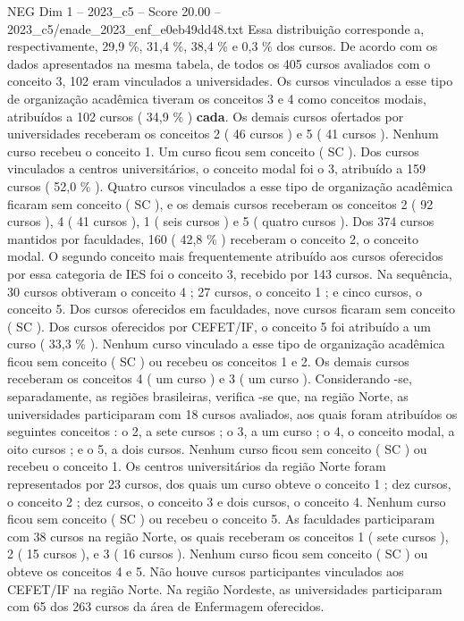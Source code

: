 \begin{textsample}{NEG Dim 1 – 2023\_c5 – Score 20.00 – 2023\_c5/enade\_2023\_enf\_e0eb49dd48.txt}
Essa distribuição corresponde a, respectivamente, 29,9 \%, 31,4 \%, 38,4 \% e 0,3 \% dos cursos.
De acordo com os dados apresentados na mesma tabela, de todos os 405 cursos avaliados com o conceito 3, 102 eram vinculados a universidades.
Os cursos vinculados a esse tipo de organização acadêmica tiveram os conceitos 3 e 4 como conceitos modais, atribuídos a 102 cursos ( 34,9 \% ) \textbf{cada}.
Os demais cursos ofertados por universidades receberam os conceitos 2 ( 46 cursos ) e 5 ( 41 cursos ).
Nenhum curso recebeu o conceito 1.
Um curso ficou sem conceito ( SC ).
Dos cursos vinculados a centros universitários, o conceito modal foi o 3, atribuído a 159 cursos ( 52,0 \% ).
Quatro cursos vinculados a esse tipo de organização acadêmica ficaram sem conceito ( SC ), e os demais cursos receberam os conceitos 2 ( 92 cursos ), 4 ( 41 cursos ), 1 ( seis cursos ) e 5 ( quatro cursos ).
Dos 374 cursos mantidos por faculdades, 160 ( 42,8 \% ) receberam o conceito 2, o conceito modal.
O segundo conceito mais frequentemente atribuído aos cursos oferecidos por essa categoria de IES foi o conceito 3, recebido por 143 cursos.
Na sequência, 30 cursos obtiveram o conceito 4 ; 27 cursos, o conceito 1 ; e cinco cursos, o conceito 5.
Dos cursos oferecidos em faculdades, nove cursos ficaram sem conceito ( SC ).
Dos cursos oferecidos por CEFET/IF, o conceito 5 foi atribuído a um curso ( 33,3 \% ).
Nenhum curso vinculado a esse tipo de organização acadêmica ficou sem conceito ( SC ) ou recebeu os conceitos 1 e 2.
Os demais cursos receberam os conceitos 4 ( um curso ) e 3 ( um curso ).
Considerando -se, separadamente, as regiões brasileiras, verifica -se que, na região Norte, as universidades participaram com 18 cursos avaliados, aos quais foram atribuídos os seguintes conceitos : o 2, a sete cursos ; o 3, a um curso ; o 4, o conceito modal, a oito cursos ; e o 5, a dois cursos.
Nenhum curso ficou sem conceito ( SC ) ou recebeu o conceito 1.
Os centros universitários da região Norte foram representados por 23 cursos, dos quais um curso obteve o conceito 1 ; dez cursos, o conceito 2 ; dez cursos, o conceito 3 e dois cursos, o conceito 4.
Nenhum curso ficou sem conceito ( SC ) ou recebeu o conceito 5.
As faculdades participaram com 38 cursos na região Norte, os quais receberam os conceitos 1 ( sete cursos ), 2 ( 15 cursos ), e 3 ( 16 cursos ).
Nenhum curso ficou sem conceito ( SC ) ou obteve os conceitos 4 e 5.
Não houve cursos participantes vinculados aos CEFET/IF na região Norte.
Na região Nordeste, as universidades participaram com 65 dos 263 cursos da área de Enfermagem oferecidos.

\end{textsample}

